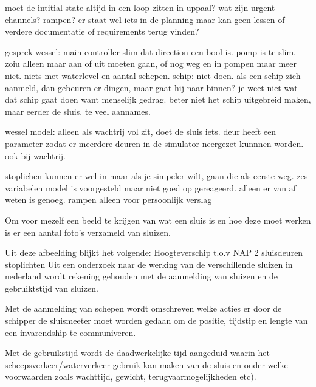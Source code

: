 


moet de intitial state altijd in een loop zitten in uppaal?
wat zijn urgent channels?
rampen? er staat wel iets in de planning maar kan geen lessen of verdere documentatie of requirements terug vinden?	


gesprek wessel:
main controller slim dat direction een bool is. 
pomp is te slim, zoiu alleen maar aan of uit moeten gaan, of nog weg en in pompen maar meer niet. niets met waterlevel en aantal schepen.
schip: niet doen. als een schip zich aanmeld, dan gebeuren er dingen, maar gaat hij naar binnen? je weet niet wat dat schip gaat doen want menselijk gedrag. beter niet het schip uitgebreid maken, maar eerder de sluis. te veel aannames.

wessel model: alleen als wachtrij vol zit, doet de sluis iets.
deur heeft een parameter zodat er meerdere deuren in de simulator neergezet kunnnen worden. ook bij wachtrij.

stoplichen kunnen er wel in maar als je simpeler wilt, gaan die als eerste weg.
zes variabelen model is voorgesteld maar niet goed op gereageerd. alleen er van af weten is genoeg.
rampen alleen voor persoonlijk verslag



Om voor mezelf een beeld te krijgen van wat een sluis is en hoe deze moet werken is er een aantal foto's verzameld van sluizen.	



Uit deze afbeelding blijkt het volgende:
Hoogteverschip t.o.v NAP
2 sluisdeuren
stoplichten
Uit een onderzoek naar de werking van de verschillende sluizen in nederland wordt rekening gehouden met de aanmelding van sluizen en de gebruiktstijd van sluizen.

Met de aanmelding van schepen wordt omschreven welke acties er door de schipper de sluismeeter moet worden gedaan om de positie, tijdstip en lengte van een invarendship te communiveren.

Met de gebruikstijd wordt  de daadwerkelijke tijd aangeduid waarin het scheepsverkeer/waterverkeer gebruik kan maken van de sluis en onder welke voorwaarden zoals wachttijd, gewicht, terugvaarmogelijkheden etc).

